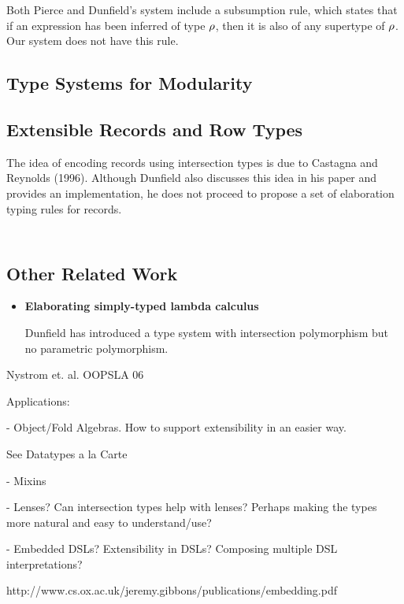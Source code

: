 Both Pierce and Dunfield's system include a subsumption rule, which states that
if an expression has been inferred of type $ \rho $, then it is also of any
supertype of $ \rho $. Our system does not have this rule.

\subsection{Type Systems for Modularity}

\subsection{Extensible Records and Row Types}

\cite{cardelli1992extensible}

The idea of encoding records using intersection types is due to Castagna and
Reynolds (1996). Although Dunfield also discusses this idea in his paper
\cite{dunfield2014elaborating} and provides an implementation, he does not
proceed to propose a set of elaboration typing rules for records.

\begin{lstlisting}
\end{lstlisting}

\begin{lstlisting}
\end{lstlisting}

\subsection{Other Related Work}

\begin{itemize}

\item{\bf Elaborating simply-typed lambda calculus}

  Dunfield has introduced a type system with intersection polymorphism but no
  parametric polymorphism.

\end{itemize}

Nystrom et. al. OOPSLA 06

Applications:

- Object/Fold Algebras. How to support extensibility in an easier way.

See Datatypes a la Carte

- Mixins

- Lenses? Can intersection types help with lenses? Perhaps making the
types more natural and easy to understand/use?

- Embedded DSLs? Extensibility in DSLs? Composing multiple DSL interpretations?

http://www.cs.ox.ac.uk/jeremy.gibbons/publications/embedding.pdf
